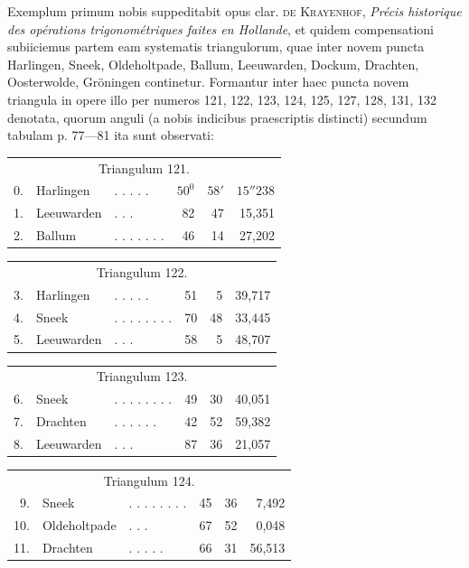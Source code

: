 Exemplum primum nobis suppeditabit opus clar. \textsc{de Krayenhof}, \textit{Précis historique des opérations trigonométriques faites en Hollande}, et quidem compensationi subiiciemus partem eam systematis triangulorum, quae inter novem puncta Harlingen, Sneek, Oldeholtpade, Ballum, Leeuwarden, Dockum, Drachten, Oosterwolde, Gröningen continetur. Formantur inter haec puncta novem triangula in opere illo per numeros 121, 122, 123, 124, 125, 127, 128, 131, 132 denotata, quorum anguli (a nobis indicibus praescriptis distincti) secundum tabulam p. 77---81 ita sunt observati:
\begin{center}
\begin{tabular}{r l l r r r}
\multicolumn{6}{c}{Triangulum 121.}\\[5pt]
0.&Harlingen&. . . . .&\(50^0\)&\(58'\)&\(15''238\)\\
1.&Leeuwarden&. . .&82&47&15,351\\
2.&Ballum&. . . . . . .&46&14&27,202
\end{tabular}
\end{center}
\begin{center}
\begin{tabular}{r l l r r r}
\multicolumn{6}{c}{Triangulum 122.}\\[5pt]
3.&Harlingen&. . . . .&51&5&39,717\\
4.&Sneek&. . . . . . . .&70&48&33,445\\
5.&Leeuwarden&. . .&58&5&48,707
\end{tabular}
\end{center}
\begin{center}
\begin{tabular}{r l l r r r}
\multicolumn{6}{c}{Triangulum 123.}\\[5pt]
6.&Sneek&. . . . . . . .&49&30&40,051\\
7.&Drachten&. . . . . .&42&52&59,382\\
8.&Leeuwarden&. . .&87&36&21,057
\end{tabular}
\end{center}
\begin{center}
\begin{tabular}{r l l r r r}
\multicolumn{6}{c}{Triangulum 124.}\\[5pt]
9.&Sneek&. . . . . . . .&45&36&7,492\\
10.&Oldeholtpade&. . .&67&52&0,048\\
11.&Drachten&. . . . .&66&31&56,513
\end{tabular}
\end{center}

